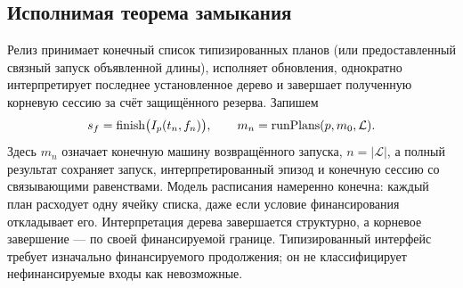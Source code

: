 \subsection{Исполнимая теорема замыкания}
Релиз принимает конечный список типизированных планов (или предоставленный связный запуск объявленной длины), исполняет обновления, однократно интерпретирует последнее установленное дерево и завершает полученную корневую сессию за счёт защищённого резерва. Запишем
\begin{equation}\label{eq:release-pipeline}
 s_f=\operatorname{finish}\bigl(I_p(t_n,f_n)\bigr),\qquad
 m_n=\operatorname{runPlans}(p,m_0,\mathcal L).
\end{equation}
Здесь $m_n$ означает конечную машину возвращённого запуска, $n=|\mathcal L|$, а полный результат сохраняет запуск, интерпретированный эпизод и конечную сессию со связывающими равенствами. Модель расписания намеренно конечна: каждый план расходует одну ячейку списка, даже если условие финансирования откладывает его. Интерпретация дерева завершается структурно, а корневое завершение --- по своей финансируемой границе. Типизированный интерфейс требует изначально финансируемого продолжения; он не классифицирует нефинансируемые входы как невозможные.

